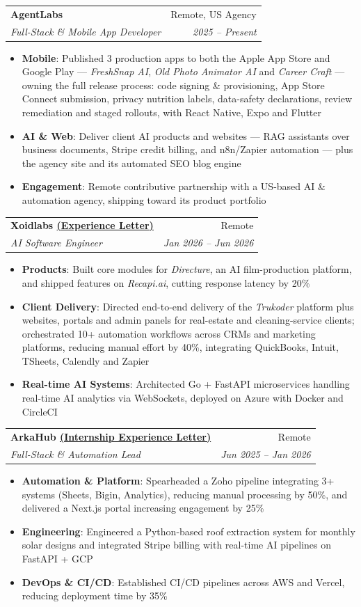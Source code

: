 \documentclass[a4paper,20pt]{article}
\makeatletter
\newcommand{\resumeItem}[2]{
  \item\small{
    \textbf{#1}{: #2 \vspace{-2pt}}
  }
}
\newcommand{\resumeSubheading}[4]{
  \vspace{-1pt}\item
  \begin{tabular*}{0.97\textwidth}{l@{\extracolsep{\fill}}r}
    \textbf{#1} & #2 \\
    \textit{#3} & \textit{#4} \\
  \end{tabular*}\vspace{-5pt}
}
\newcommand{\resumeSubItem}[2]{\resumeItem{#1}{#2}\vspace{-3pt}}
\newcommand{\resumeSubHeadingListStart}{\begin{itemize}[leftmargin=*]}
\newcommand{\resumeSubHeadingListEnd}{\end{itemize}}
\makeatother
\begin{document}
  \resumeSubheading
    {AgentLabs}{Remote, US Agency}
    {Full-Stack \& Mobile App Developer}{2025 -- Present}
  \resumeSubHeadingListStart
    \resumeSubItem{Mobile}
      {Published 3 production apps to both the Apple App Store and Google Play --- \textit{FreshSnap AI}, \textit{Old Photo Animator AI} and \textit{Career Craft} --- owning the full release process: code signing \& provisioning, App Store Connect submission, privacy nutrition labels, data-safety declarations, review remediation and staged rollouts, with React Native, Expo and Flutter}
    \resumeSubItem{AI \& Web}
      {Deliver client AI products and websites --- RAG assistants over business documents, Stripe credit billing, and n8n/Zapier automation --- plus the agency site and its automated SEO blog engine}
    \resumeSubItem{Engagement}
      {Remote contributive partnership with a US-based AI \& automation agency, shipping toward its product portfolio}
  \resumeSubHeadingListEnd
  \vspace{2pt}

  \resumeSubheading
    {Xoidlabs \href{https://www.linkedin.com/in/shubham996633/overlay/Position/2940254151/treasury/?profileId=ACoAAD9AANcBI0cT4PH9Iwml9GpQeX9pKxOGqqQ}{(Experience Letter)}}{Remote}
    {AI Software Engineer}{Jan 2026 -- Jun 2026}
  \resumeSubHeadingListStart
    \resumeSubItem{Products}
      {Built core modules for \textit{Directure}, an AI film-production platform, and shipped features on \textit{Recapi.ai}, cutting response latency by 20\%}
    \resumeSubItem{Client Delivery}
      {Directed end-to-end delivery of the \textit{Trukoder} platform plus websites, portals and admin panels for real-estate and cleaning-service clients; orchestrated 10+ automation workflows across CRMs and marketing platforms, reducing manual effort by 40\%, integrating QuickBooks, Intuit, TSheets, Calendly and Zapier}
    \resumeSubItem{Real-time AI Systems}
      {Architected Go + FastAPI microservices handling real-time AI analytics via WebSockets, deployed on Azure with Docker and CircleCI}
  \resumeSubHeadingListEnd
  \vspace{2pt}

  \resumeSubheading
    {ArkaHub \href{https://drive.google.com/file/d/1h5-ib4JUMhwSV7AL6kiYRcWSV32-Nazl/view?usp=sharing}{(Internship Experience Letter)}}{Remote}
    {Full-Stack \& Automation Lead}{Jun 2025 -- Jan 2026}
  \resumeSubHeadingListStart
    \resumeSubItem{Automation \& Platform}
      {Spearheaded a Zoho pipeline integrating 3+ systems (Sheets, Bigin, Analytics), reducing manual processing by 50\%, and delivered a Next.js portal increasing engagement by 25\%}
    \resumeSubItem{Engineering}
      {Engineered a Python-based roof extraction system for monthly solar designs and integrated Stripe billing with real-time AI pipelines on FastAPI + GCP}
    \resumeSubItem{DevOps \& CI/CD}
      {Established CI/CD pipelines across AWS and Vercel, reducing deployment time by 35\%}
  \resumeSubHeadingListEnd
  \vspace{2pt}
\end{document}
